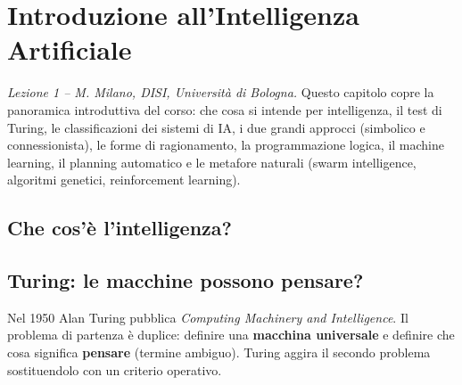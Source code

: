 % 

\chapter{Introduzione all'Intelligenza Artificiale}

\textit{Lezione 1 -- M. Milano, DISI, Università di Bologna.}
Questo capitolo copre la panoramica introduttiva del corso: che cosa si intende per
intelligenza, il test di Turing, le classificazioni dei sistemi di IA, i due grandi
approcci (simbolico e connessionista), le forme di ragionamento, la programmazione
logica, il machine learning, il planning automatico e le metafore naturali
(swarm intelligence, algoritmi genetici, reinforcement learning).

\section{Che cos'è l'intelligenza?}



\section{Turing: le macchine possono pensare?}

Nel 1950 Alan Turing pubblica \emph{Computing Machinery and Intelligence}.
Il problema di partenza è duplice: definire una \textbf{macchina universale} e
definire che cosa significa \textbf{pensare} (termine ambiguo). Turing aggira il
secondo problema sostituendolo con un criterio operativo.

